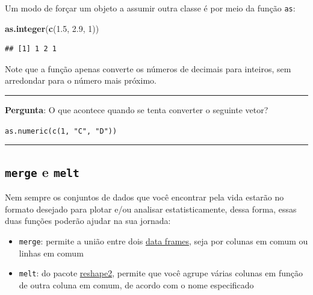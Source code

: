 \documentclass[]{book}
\newenvironment{Shaded}{\begin{snugshade}}{\end{snugshade}}
\newcommand{\KeywordTok}[1]{\textcolor[rgb]{0.13,0.29,0.53}{\textbf{#1}}}
\newcommand{\DecValTok}[1]{\textcolor[rgb]{0.00,0.00,0.81}{#1}}
\newcommand{\FloatTok}[1]{\textcolor[rgb]{0.00,0.00,0.81}{#1}}
\newcommand{\NormalTok}[1]{#1}
\providecommand{\tightlist}{%
  \setlength{\itemsep}{0pt}\setlength{\parskip}{0pt}}
\theoremstyle{definition}
\theoremstyle{definition}
\theoremstyle{definition}
\theoremstyle{remark}
\begin{document}
Um modo de forçar um objeto a assumir outra classe é por meio da função
\texttt{as}:

\begin{Shaded}
\begin{Highlighting}[]
\KeywordTok{as.integer}\NormalTok{(}\KeywordTok{c}\NormalTok{(}\FloatTok{1.5}\NormalTok{, }\FloatTok{2.9}\NormalTok{, }\DecValTok{1}\NormalTok{))}
\end{Highlighting}
\end{Shaded}

\begin{verbatim}
## [1] 1 2 1
\end{verbatim}

Note que a função apenas converte os números de decimais para inteiros,
sem arredondar para o número mais próximo.

\begin{center}\rule{0.5\linewidth}{\linethickness}\end{center}

{\textbf{Pergunta}: O que acontece quando se tenta converter o seguinte
vetor?}

\texttt{as.numeric(c(1,\ "C",\ "D"))}

\begin{center}\rule{0.5\linewidth}{\linethickness}\end{center}

\hypertarget{convert_df}{\subsection{\texorpdfstring{\texttt{merge} e
\texttt{melt}}{merge e melt}}\label{convert_df}}

Nem sempre os conjuntos de dados que você encontrar pela vida estarão no
formato desejado para plotar e/ou analisar estatisticamente, dessa
forma, essas duas funções poderão ajudar na sua jornada:

\begin{itemize}
\tightlist
\item
  \texttt{merge}: permite a união entre dois
  \protect\hyperlink{dataframes}{data frames}, seja por colunas em comum
  ou linhas em comum
\item
  \texttt{melt}: do pacote
  \href{https://cran.r-project.org/web/packages/reshape2/reshape2.pdf}{reshape2},
  permite que você agrupe várias colunas em função de outra coluna em
  comum, de acordo com o nome especificado
\end{itemize}
\end{document}
